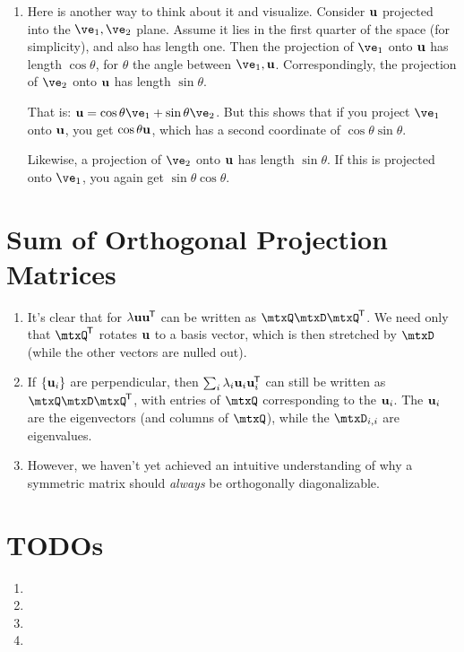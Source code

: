\documentclass[11pt, oneside]{amsart}
\begin{document}
\begin{enumerate}
  \item Here is another way to think about it and visualize. Consider
  $\bm{\mathrm{u}}$ projected into the $\ve_1, \ve_2$ plane. Assume it lies in the
  first quarter of the space (for simplicity), and also has length one.
  Then the projection of $\ve_1$ onto $\bm{\mathrm{u}}$ has length $\cos\theta$, for
  $\theta$ the angle between $\ve_1, \vu$. Correspondingly, the
  projection of $\ve_2$ onto $\bm{\mathrm{u}}$ has length $\sin\theta$.

  That is: $\vu = \cos\theta \ve_1 + \sin\theta \ve_2$. But this shows
  that if you project $\ve_1$ onto $\bm{\mathrm{u}}$, you get $\cos\theta \bm{\mathrm{u}}$,
  which has a second coordinate of $\cos\theta \sin\theta$.

  Likewise, a projection of $\ve_2$ onto $\bm{\mathrm{u}}$ has length $\sin\theta$.
  If this is projected onto $\ve_1$, you again get $\sin\theta
  \cos\theta$.
\end{enumerate}

\section{Sum of Orthogonal Projection Matrices}

\begin{enumerate}
  \item It's clear that for $\lambda \bm{\mathrm{u}}\bm{\mathrm{u}}^{\mkern-1.5mu\mathsf{T}}$ can be written as
  $\mtxQ\mtxD\mtxQ\tran$. We need only that $\mtxQ\tran$ rotates $\bm{\mathrm{u}}$
  to a basis vector, which is then stretched by $\mtxD$ (while the other
  vectors are nulled out).

  \item If $\left\{ \bm{\mathrm{u}}_i \right\}$ are perpendicular, then $\sum_i \lambda_i
  \bm{\mathrm{u}}_i \bm{\mathrm{u}}_i^{\mkern-1.5mu\mathsf{T}}$ can still be written as $\mtxQ\mtxD\mtxQ\tran$, with
  entries of $\mtxQ$ corresponding to the $\bm{\mathrm{u}}_i$. The $\bm{\mathrm{u}}_i$ are the
  eigenvectors (and columns of $\mtxQ$), while the $\mtxD_{i, i}$ are
  eigenvalues.

  \item However, we haven't yet achieved an intuitive understanding of
  why a symmetric matrix should \emph{always} be orthogonally
  diagonalizable.
\end{enumerate}

\section{TODOs}

\begin{enumerate}
  \item {}

  \item {}

  \item {}

  \item {}
\end{enumerate}
\end{document}
